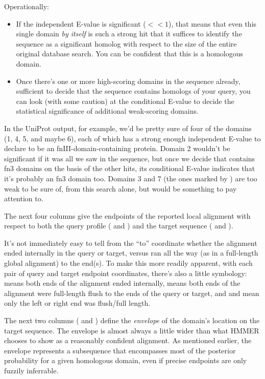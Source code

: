 Operationally:

\begin{itemize}
\item If the independent E-value is significant ($<<1$), that means
that even this single domain \emph{by itself} is such a strong hit
that it suffices to identify the sequence as a significant homolog
with respect to the size of the entire original database search. You
can be confident that this is a homologous domain.

\item Once there's one or more high-scoring domains in the sequence
already, sufficient to decide that the sequence contains homologs of
your query, you can look (with some caution) at the conditional
E-value to decide the statistical significance of additional
weak-scoring domains.
\end{itemize}

In the UniProt output, for example, we'd be pretty sure of four of the
domains (1, 4, 5, and maybe 6), each of which has a strong enough
independent E-value to declare  to be an
fnIII-domain-containing protein. Domain 2 wouldn't be significant if
it was all we saw in the sequence, but once we decide that
 contains fn3 domains on the basis of the other
hits, its conditional E-value indicates that it's probably an fn3
domain too. Domains 3 and 7 (the ones marked by ) are too weak
to be sure of, from this search alone, but would be something to pay
attention to.

The next four columns give the endpoints of the reported local
alignment with respect to both the query profile ( and
) and the target sequence ( and ).

It's not immediately easy to tell from the ``to'' coordinate whether
the alignment ended internally in the query or target, versus ran all
the way (as in a full-length global alignment) to the end(s). To make
this more readily apparent, with each pair of query and target
endpoint coordinates, there's also a little symbology: 
means both ends of the alignment ended internally, \mono{[]}
means both ends of the alignment were full-length flush to the ends of
the query or target, and \mono{[.} and \mono{.]} mean only the left or
right end was flush/full length. 

The next two columns ( and ) define the
\emph{envelope} of the domain's location on the target sequence.  The
envelope is almost always a little wider than what HMMER chooses to
show as a reasonably confident alignment. As mentioned earlier, the
envelope represents a subsequence that encompasses most of the
posterior probability for a given homologous domain, even if precise
endpoints are only fuzzily inferrable.

